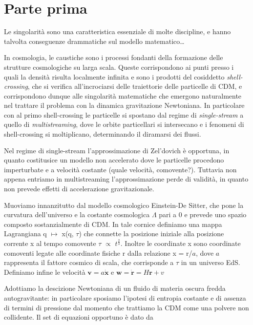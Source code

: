 \section{Parte prima}

Le singolarità sono una caratteristica essenziale di molte discipline, e hanno talvolta conseguenze
drammatiche sul modello matematico\dots

In cosmologia, le caustiche sono i processi fondanti della formazione delle strutture cosmologiche
su larga scala. Queste corrispondono ai punti presso i quali la densità risulta localmente infinita
e sono i prodotti del cosiddetto \textit{shell-crossing}, che si verifica all'incrociarsi delle traiettorie
delle particelle di CDM, e corrispondono dunque alle singolarità matematiche che emergono naturalmente
nel trattare il problema con la dinamica gravitazione Newtoniana.
In particolare con al primo shell-crossing le particelle si spostano dal regime di \textit{single-stream}
a quello di \textit{multistreaming}, dove le orbite particellari si intersecano e i fenomeni di shell-crossing
si moltiplicano, determinando il diramarsi dei flussi.

Nel regime di single-stream l'approssimazione di Zel'dovich è opportuna, in quanto costitusice un modello non
accelerato dove le particelle procedono imperturbate e a velocità costante (quale velocità, comovente?).
Tuttavia non appena entriamo in multistreaming l'approssimazione perde di validità, in quanto non prevede
effetti di accelerazione gravitazionale.

Muoviamo innanzitutto dal modello cosmologico Einstein-De Sitter, che pone la curvatura dell'universo
e la costante cosmologica $\Lambda$ pari a 0 e prevede uno spazio composto sostanzialmente di CDM.
In tale cornice definiamo una mappa Lagrangiana q $\mapsto$ x(q, $\tau$) che connette la posizione
iniziale alla posizione corrente x al tempo comovente $\tau$ $\propto$ $t^{\frac{2}{3}}$.
Inoltre le coordinate x sono coordinate comoventi legate alle coordinate fisiche r dalla relazione
x = r/$a$, dove $a$ rappresenta il fattore cosmico di scala, che corrisponde a $\tau$ in un universo
EdS.
Definiamo infine le velocità $\bm{v} = a \dot{\bm{x}}$ e $\bm{w} = \dot{\bm{r}} = H \bm{r} + v$

Adottiamo la descizione Newtoniana di un fluido di materia oscura fredda autogravitante: in particolare
sposiamo l'ipotesi di entropia costante e di assenza di termini di pressione dal momento che trattiamo 
la CDM come una polvere non collidente. Il set di equazioni opportuno è dato da

